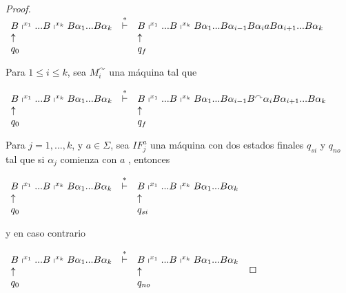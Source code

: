 \begin{lemma}
\begin{proof}
		\bigskip


    $\displaystyle \begin{array}{lcl} B\shortmid ^{x_{1}}...B\shortmid ^{x_{k}}B\alpha _{1}...B\alpha _{k} &
    \overset{\ast }{\vdash } & B\shortmid ^{x_{1}}...B\shortmid ^{x_{k}}B\alpha _{1}...B\alpha _{i-1}B\alpha
    _{i}aB\alpha _{i+1}...B\alpha _{k} \\ \uparrow & & \uparrow \\ q_{0} & & q_{f} \end{array} $

		\bigskip

    \noindent Para $1\leq i\leq k$, sea $M_{i}^{\curvearrowright }$ una máquina tal que

    $\displaystyle \begin{array}{lcl} B\shortmid ^{x_{1}}...B\shortmid ^{x_{k}}B\alpha _{1}...B\alpha _{k} &
    \overset{\ast }{\vdash } & B\shortmid ^{x_{1}}...B\shortmid ^{x_{k}}B\alpha _{1}...B\alpha _{i-1}B
    ^{\curvearrowright }\alpha _{i}B\alpha _{i+1}...B\alpha _{k} \\ \uparrow & & \uparrow \\ q_{0} & & q_{f} \end{array} $

		\bigskip

    \noindent Para $j=1,...,k$, y $a\in \Sigma $, sea $IF_{j}^{a}$ una máquina con dos estados finales $q_{si}$ y
    $q_{no}$ tal que si $\alpha _{j}$ comienza con $a$ , entonces

		\bigskip

    $\displaystyle \begin{array}{lcl} B\shortmid ^{x_{1}}...B\shortmid ^{x_{k}}B\alpha _{1}...B\alpha _{k} &
    \overset{\ast }{\vdash } & B\shortmid ^{x_{1}}...B\shortmid ^{x_{k}}B\alpha _{1}...B\alpha _{k} \\
    \uparrow & & \uparrow \\ q_{0} & & q_{si} \end{array} $

    \noindent y en caso contrario

		\bigskip

    $\displaystyle \begin{array}{lcl} B\shortmid ^{x_{1}}...B\shortmid ^{x_{k}}B\alpha _{1}...B\alpha _{k} &
    \overset{\ast }{\vdash } & B\shortmid ^{x_{1}}...B\shortmid ^{x_{k}}B\alpha _{1}...B\alpha _{k} \\
    \uparrow & & \uparrow \\ q_{0} & & q_{no} \end{array} $


\end{proof}
\end{lemma}

